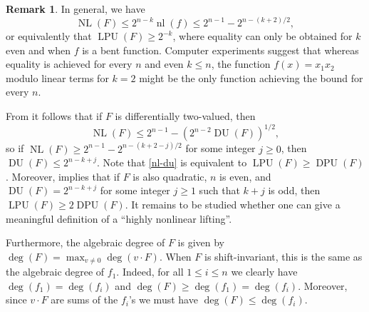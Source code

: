 \documentclass[11pt,english,a4paper]{amsart}
\theoremstyle{plain}
\theoremstyle{definition}
\newtheorem{remark}[theorem]{Remark}
\theoremstyle{remark}
\begin{document}
\begin{remark}
In general, we have
\[
\operatorname{NL}(F) \leq 2^{n-k}\operatorname{nl}(f) \leq 2^{n-1}-2^{n-(k+2)/2},
\]
or equivalently that $\operatorname{LPU}(F)\geq 2^{-k}$, where equality can only be obtained for $k$ even and when $f$ is a bent function. Computer experiments suggest that whereas equality is achieved for every $n$ and even $k\leq n$, the function $f(x)=x_1x_2$ modulo linear terms for $k=2$ might be the only function achieving the bound for every $n$.

From \cite[Theorem~4]{charpin-peng} it follows that if $F$ is differentially two-valued, then
\begin{equation}\label{nl-du}
\operatorname{NL}(F) \leq 2^{n-1} - (2^{n-2}\operatorname{DU}(F))^{1/2},
\end{equation}
so if $\operatorname{NL}(F) \geq 2^{n-1}-2^{n-(k+2-j)/2}$ for some integer $j\geq 0$, then $\operatorname{DU}(F)\leq 2^{n-k+j}$. Note that \eqref{nl-du} is equivalent to $\operatorname{LPU}(F)\geq \operatorname{DPU}(F)$. Moreover, \cite[Theorem~6]{charpin-peng} implies that if $F$ is also quadratic, $n$ is even, and $\operatorname{DU}(F)=2^{n-k+j}$ for some integer $j\geq 1$ such that $k+j$ is odd, then $\operatorname{LPU}(F)\geq 2\operatorname{DPU}(F)$. It remains to be studied whether one can give a meaningful definition of a ``highly nonlinear lifting''.

\end{remark}
	
	Furthermore, the algebraic degree of $F$ is given by $\operatorname{deg}(F)=\max_{v\neq 0}\operatorname{deg}(v\cdot F)$. When $F$ is shift-invariant, this is the same as the algebraic degree of $f_1$. Indeed, for all $1\leq i\leq n$ we clearly have $\operatorname{deg}(f_1)=\operatorname{deg}(f_i)$ and $\operatorname{deg}(F)\geq\operatorname{deg}(f_1)=\operatorname{deg}(f_i)$. Moreover, since $v\cdot F$ are sums of the $f_i$'s we must have $\operatorname{deg}(F)\leq\operatorname{deg}(f_i)$.
		
	\medskip
	
\end{document}
